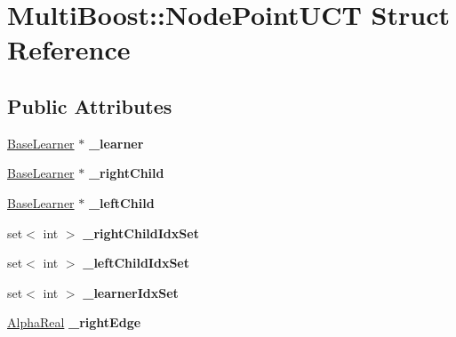 \hypertarget{structMultiBoost_1_1NodePointUCT}{
\section{MultiBoost::NodePointUCT Struct Reference}
\label{structMultiBoost_1_1NodePointUCT}
}
\subsection*{Public Attributes}
\begin{DoxyCompactItemize}
\item 
\hypertarget{structMultiBoost_1_1NodePointUCT_a87df3ab83c7bd99ee00dd3eaa9d3b4a2}{
\hyperlink{classMultiBoost_1_1BaseLearner}{BaseLearner} $\ast$ {\bfseries \_\-learner}}
\label{structMultiBoost_1_1NodePointUCT_a87df3ab83c7bd99ee00dd3eaa9d3b4a2}

\item 
\hypertarget{structMultiBoost_1_1NodePointUCT_ab0bafcc46b4a94542f6f79c15bad466d}{
\hyperlink{classMultiBoost_1_1BaseLearner}{BaseLearner} $\ast$ {\bfseries \_\-rightChild}}
\label{structMultiBoost_1_1NodePointUCT_ab0bafcc46b4a94542f6f79c15bad466d}

\item 
\hypertarget{structMultiBoost_1_1NodePointUCT_a63ff9047448c91546ebfd6da431eb222}{
\hyperlink{classMultiBoost_1_1BaseLearner}{BaseLearner} $\ast$ {\bfseries \_\-leftChild}}
\label{structMultiBoost_1_1NodePointUCT_a63ff9047448c91546ebfd6da431eb222}

\item 
\hypertarget{structMultiBoost_1_1NodePointUCT_a9ce8e42b07dae07cd8872edb7a92f824}{
set$<$ int $>$ {\bfseries \_\-rightChildIdxSet}}
\label{structMultiBoost_1_1NodePointUCT_a9ce8e42b07dae07cd8872edb7a92f824}

\item 
\hypertarget{structMultiBoost_1_1NodePointUCT_ae264e42026b9474c7f79162b66d8395c}{
set$<$ int $>$ {\bfseries \_\-leftChildIdxSet}}
\label{structMultiBoost_1_1NodePointUCT_ae264e42026b9474c7f79162b66d8395c}

\item 
\hypertarget{structMultiBoost_1_1NodePointUCT_a17f788f0ae14e0ab439df3ced8167cb0}{
set$<$ int $>$ {\bfseries \_\-learnerIdxSet}}
\label{structMultiBoost_1_1NodePointUCT_a17f788f0ae14e0ab439df3ced8167cb0}

\item 
\hypertarget{structMultiBoost_1_1NodePointUCT_a668734853c8f773f76f513415fc1f526}{
\hyperlink{Defaults_8h_a80184c4fd10ab70a1a17c5f97dcd1563}{AlphaReal} {\bfseries \_\-rightEdge}}
\label{structMultiBoost_1_1NodePointUCT_a668734853c8f773f76f513415fc1f526}


\end{DoxyCompactItemize}

